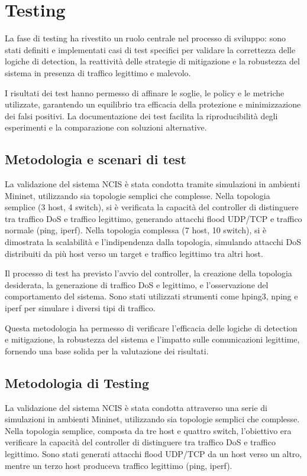 \chapter{Testing}

La fase di testing ha rivestito un ruolo centrale nel processo di sviluppo: sono stati definiti e implementati casi di test specifici per validare la correttezza delle logiche di detection, la reattività delle strategie di mitigazione e la robustezza del sistema in presenza di traffico legittimo e malevolo.\par
I risultati dei test hanno permesso di affinare le soglie, le policy e le metriche utilizzate, garantendo un equilibrio tra efficacia della protezione e minimizzazione dei falsi positivi. La documentazione dei test facilita la riproducibilità degli esperimenti e la comparazione con soluzioni alternative.
\section{Metodologia e scenari di test}
La validazione del sistema NCIS è stata condotta tramite simulazioni in ambienti Mininet, utilizzando sia topologie semplici che complesse. Nella topologia semplice (3 host, 4 switch), si è verificata la capacità del controller di distinguere tra traffico DoS e traffico legittimo, generando attacchi flood UDP/TCP e traffico normale (ping, iperf). Nella topologia complessa (7 host, 10 switch), si è dimostrata la scalabilità e l’indipendenza dalla topologia, simulando attacchi DoS distribuiti da più host verso un target e traffico legittimo tra altri host.\par
Il processo di test ha previsto l’avvio del controller, la creazione della topologia desiderata, la generazione di traffico DoS e legittimo, e l’osservazione del comportamento del sistema. Sono stati utilizzati strumenti come hping3, nping e iperf per simulare i diversi tipi di traffico.\par
Questa metodologia ha permesso di verificare l’efficacia delle logiche di detection e mitigazione, la robustezza del sistema e l’impatto sulle comunicazioni legittime, fornendo una base solida per la valutazione dei risultati.
\section{Metodologia di Testing}

La validazione del sistema NCIS è stata condotta attraverso una serie di simulazioni in ambienti Mininet, utilizzando sia topologie semplici che complesse. Nella topologia semplice, composta da tre host e quattro switch, l’obiettivo era verificare la capacità del controller di distinguere tra traffico DoS e traffico legittimo. Sono stati generati attacchi flood UDP/TCP da un host verso un altro, mentre un terzo host produceva traffico legittimo (ping, iperf).


